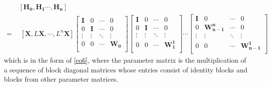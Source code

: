 \documentclass{article}
\newcommand{\colvec}[2][1]{%
	\scalebox{#1}{%
		\renewcommand{\arraystretch}{1.45}%
		$\begin{bmatrix}#2\end{bmatrix}$%
	}
}
\begin{document}
\begin{align*}
 & [\bm{H_0}, \bm{H_1} \cdots,  \bm{H_n}] \\
  =\ &  \ [\bm{X}, L\bm{X}, \cdots,  L^{n} \bm{X}]
\begin{bmatrix}
 \bm{I} & 0 & \cdots & 0 \\[6pt]
 0 & \bm{I} & \cdots & 0 \\[0pt]
 \vdots & \vdots & \ddots  & \vdots\\[6pt]
 0 & 0 & \cdots  & \bm{W_0} \\
\end{bmatrix}
\begin{bmatrix}
\bm{I} & 0 & \cdots & 0 \\[6pt]
0 & \bm{I} & \cdots & 0 \\[0pt]
 \vdots & \vdots & \ddots  & \vdots\\[6pt]
 0 & 0 & \cdots &  \bm{{W_1^1}} \\
\end{bmatrix}
\cdots
\begin{bmatrix}
 \bm{I} & 0 & \cdots & 0\\[6pt]
 0 & \bm{W_{n-1}^{n}} & \cdots & 0 \\[0pt]
 \vdots & \vdots & \ddots & \vdots\\[6pt]
 0 & 0 & \cdots &  \bm{W_{n-1}^1} \\
\end{bmatrix}
\end{align*}
which is in the form of \eqref{eq6}, where the parameter matrix is the multiplication of a sequence of block diagonal matrices whose entries consist of identity blocks and blocks from other parameter matrices.
\end{document}
